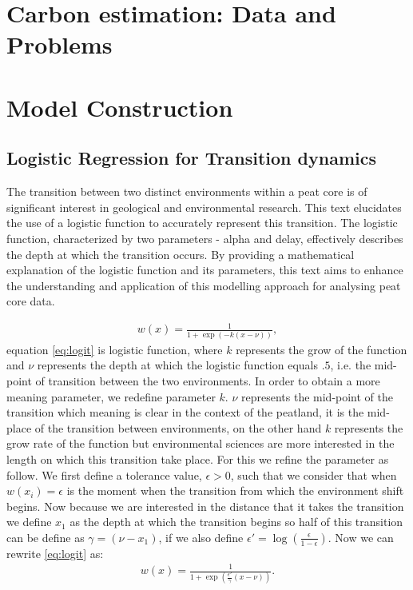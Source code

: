 \documentclass [10pt] {article}
\begin{document}
\section{Carbon estimation: Data and Problems}

\section{Model Construction}



\subsection{Logistic Regression for Transition dynamics}
The transition between two distinct environments within a peat core is of significant interest in geological and environmental research. This text elucidates the use of a logistic function to accurately represent this transition. The logistic function, characterized by two parameters - alpha and delay, effectively describes the depth at which the transition occurs. By providing a mathematical explanation of the logistic function and its parameters, this text aims to enhance the understanding and application of this modelling approach for analysing peat core data.

\begin{eqnarray}
	w(x) =\frac{ 1} {1 + \exp(-k(x - \nu))}, \label{eq:logit}
\end{eqnarray} 
equation \ref{eq:logit} is logistic function, where $k$ represents the grow of the function and $\nu$ represents the depth at which the logistic function equals $.5$, i.e. the mid-point of transition between the two environments. In order to obtain a more meaning parameter, we redefine parameter $k$. $\nu$ represents the mid-point of the transition which meaning is clear in the context of the peatland, it is the mid-place of the transition between environments, on the other hand $k$ represents the grow rate of the function but environmental sciences are more interested in the length on which this transition take place. For this we refine the parameter as follow. We first define a tolerance value, $\epsilon>0$, such that we consider that when $w(x_i)=\epsilon$ is the moment when the transition from which the environment shift begins. Now because we are interested in the distance that it takes the transition we define $x_1$ as the depth at which the transition begins so half of this transition can be define as $\gamma = (\nu-x_1)$, if we also define $\epsilon' = \log(\frac{\epsilon}{1-\epsilon})$. Now we can rewrite \ref{eq:logit} as:
\begin{eqnarray}
	w(x) =\frac{1}{1 + \exp\left(\frac{\epsilon'}{\gamma}(x - \nu)\right)}. \label{eq:w_fun}
\end{eqnarray} 
\end{document}
